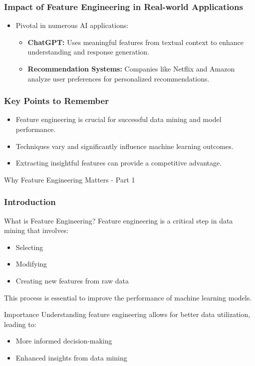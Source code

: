 \documentclass[aspectratio=169]{beamer}
\begin{document}
\begin{frame}[fragile]
    \frametitle{Impact of Feature Engineering in Real-world Applications}
    \begin{itemize}
        \item Pivotal in numerous AI applications:
        \begin{itemize}
            \item \textbf{ChatGPT:} Uses meaningful features from textual context to enhance understanding and response generation.
            \item \textbf{Recommendation Systems:} Companies like Netflix and Amazon analyze user preferences for personalized recommendations.
        \end{itemize}
    \end{itemize}
\end{frame}

\begin{frame}[fragile]
    \frametitle{Key Points to Remember}
    \begin{itemize}
        \item Feature engineering is crucial for successful data mining and model performance.
        \item Techniques vary and significantly influence machine learning outcomes.
        \item Extracting insightful features can provide a competitive advantage.
    \end{itemize}
\end{frame}

\begin{frame}[fragile]{Why Feature Engineering Matters - Part 1}
    \frametitle{Introduction}
    \begin{block}{What is Feature Engineering?}
        Feature engineering is a critical step in data mining that involves:
        \begin{itemize}
            \item Selecting
            \item Modifying
            \item Creating new features from raw data
        \end{itemize}
        This process is essential to improve the performance of machine learning models.
    \end{block}
    
    \begin{block}{Importance}
        Understanding feature engineering allows for better data utilization, leading to:
        \begin{itemize}
            \item More informed decision-making
            \item Enhanced insights from data mining
        \end{itemize}
    \end{block}
\end{frame}
\end{document}
